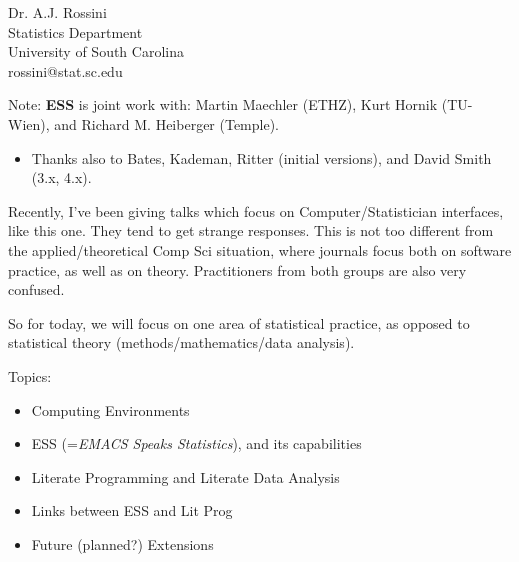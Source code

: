 \documentclass[semhelv]{seminar}
\begin{document}
\typeout{ }
\typeout{ }

\begin{slide}

  \begin{center}
    Dr. A.J. Rossini \\
    Statistics Department \\
    University of South Carolina \\
    rossini@stat.sc.edu \\
  \end{center}
  
  Note: \textbf{ESS} is joint work with: Martin Maechler (ETHZ), Kurt
  Hornik (TU-Wien), and Richard M. Heiberger (Temple).
\end{slide}

\begin{itemize}
\item Thanks also to Bates, Kademan, Ritter (initial versions), and
  David Smith (3.x, 4.x).
\end{itemize}

Recently, I've been giving talks which focus on Computer/Statistician
interfaces, like this one.  They tend to get strange responses.  This
is not too different from the applied/theoretical Comp Sci situation,
where journals focus both on software practice, as well as on theory.
Practitioners from both groups are also very confused.

So for today, we will focus on one area of statistical practice, as
opposed to statistical theory (methods/mathematics/data analysis).

\begin{slide}
  
  Topics:
  \begin{itemize}
  \item Computing Environments
  \item ESS (=\emph{EMACS Speaks Statistics}), and its capabilities
  \item Literate Programming and Literate Data Analysis
  \item Links between ESS and Lit Prog
  \item Future (planned?) Extensions
  \end{itemize}

\end{slide}
\end{document}
